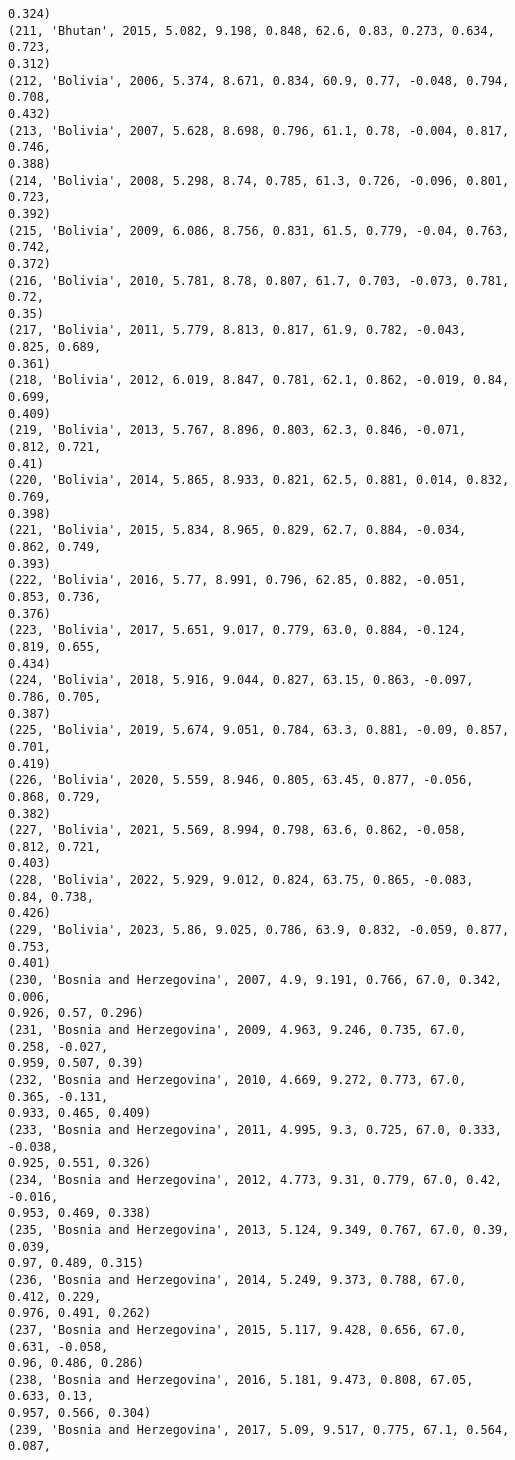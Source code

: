 \documentclass[11pt]{article}
\begin{document}
\begin{Verbatim}[commandchars=\\\{\}]
0.324)
(211, 'Bhutan', 2015, 5.082, 9.198, 0.848, 62.6, 0.83, 0.273, 0.634, 0.723,
0.312)
(212, 'Bolivia', 2006, 5.374, 8.671, 0.834, 60.9, 0.77, -0.048, 0.794, 0.708,
0.432)
(213, 'Bolivia', 2007, 5.628, 8.698, 0.796, 61.1, 0.78, -0.004, 0.817, 0.746,
0.388)
(214, 'Bolivia', 2008, 5.298, 8.74, 0.785, 61.3, 0.726, -0.096, 0.801, 0.723,
0.392)
(215, 'Bolivia', 2009, 6.086, 8.756, 0.831, 61.5, 0.779, -0.04, 0.763, 0.742,
0.372)
(216, 'Bolivia', 2010, 5.781, 8.78, 0.807, 61.7, 0.703, -0.073, 0.781, 0.72,
0.35)
(217, 'Bolivia', 2011, 5.779, 8.813, 0.817, 61.9, 0.782, -0.043, 0.825, 0.689,
0.361)
(218, 'Bolivia', 2012, 6.019, 8.847, 0.781, 62.1, 0.862, -0.019, 0.84, 0.699,
0.409)
(219, 'Bolivia', 2013, 5.767, 8.896, 0.803, 62.3, 0.846, -0.071, 0.812, 0.721,
0.41)
(220, 'Bolivia', 2014, 5.865, 8.933, 0.821, 62.5, 0.881, 0.014, 0.832, 0.769,
0.398)
(221, 'Bolivia', 2015, 5.834, 8.965, 0.829, 62.7, 0.884, -0.034, 0.862, 0.749,
0.393)
(222, 'Bolivia', 2016, 5.77, 8.991, 0.796, 62.85, 0.882, -0.051, 0.853, 0.736,
0.376)
(223, 'Bolivia', 2017, 5.651, 9.017, 0.779, 63.0, 0.884, -0.124, 0.819, 0.655,
0.434)
(224, 'Bolivia', 2018, 5.916, 9.044, 0.827, 63.15, 0.863, -0.097, 0.786, 0.705,
0.387)
(225, 'Bolivia', 2019, 5.674, 9.051, 0.784, 63.3, 0.881, -0.09, 0.857, 0.701,
0.419)
(226, 'Bolivia', 2020, 5.559, 8.946, 0.805, 63.45, 0.877, -0.056, 0.868, 0.729,
0.382)
(227, 'Bolivia', 2021, 5.569, 8.994, 0.798, 63.6, 0.862, -0.058, 0.812, 0.721,
0.403)
(228, 'Bolivia', 2022, 5.929, 9.012, 0.824, 63.75, 0.865, -0.083, 0.84, 0.738,
0.426)
(229, 'Bolivia', 2023, 5.86, 9.025, 0.786, 63.9, 0.832, -0.059, 0.877, 0.753,
0.401)
(230, 'Bosnia and Herzegovina', 2007, 4.9, 9.191, 0.766, 67.0, 0.342, 0.006,
0.926, 0.57, 0.296)
(231, 'Bosnia and Herzegovina', 2009, 4.963, 9.246, 0.735, 67.0, 0.258, -0.027,
0.959, 0.507, 0.39)
(232, 'Bosnia and Herzegovina', 2010, 4.669, 9.272, 0.773, 67.0, 0.365, -0.131,
0.933, 0.465, 0.409)
(233, 'Bosnia and Herzegovina', 2011, 4.995, 9.3, 0.725, 67.0, 0.333, -0.038,
0.925, 0.551, 0.326)
(234, 'Bosnia and Herzegovina', 2012, 4.773, 9.31, 0.779, 67.0, 0.42, -0.016,
0.953, 0.469, 0.338)
(235, 'Bosnia and Herzegovina', 2013, 5.124, 9.349, 0.767, 67.0, 0.39, 0.039,
0.97, 0.489, 0.315)
(236, 'Bosnia and Herzegovina', 2014, 5.249, 9.373, 0.788, 67.0, 0.412, 0.229,
0.976, 0.491, 0.262)
(237, 'Bosnia and Herzegovina', 2015, 5.117, 9.428, 0.656, 67.0, 0.631, -0.058,
0.96, 0.486, 0.286)
(238, 'Bosnia and Herzegovina', 2016, 5.181, 9.473, 0.808, 67.05, 0.633, 0.13,
0.957, 0.566, 0.304)
(239, 'Bosnia and Herzegovina', 2017, 5.09, 9.517, 0.775, 67.1, 0.564, 0.087,

\end{Verbatim}
\end{document}
